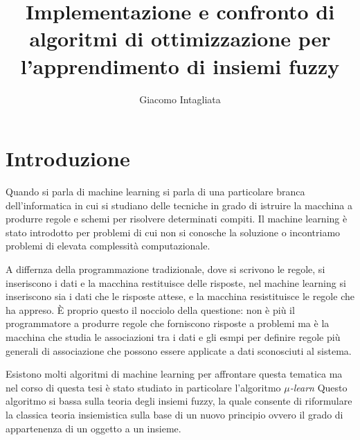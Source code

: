 \documentclass[a4paper,12pt]{report}
\begin{document}
\title{Implementazione e confronto di algoritmi di ottimizzazione per l'apprendimento di insiemi fuzzy}
\author{Giacomo Intagliata}
%
% 
%
\beforepreface

%
%
\afterpreface

%
\chapter*{Introduzione}
\label{Introduzione}

Quando si parla di machine learning si parla di una particolare branca dell'informatica in cui si studiano delle tecniche in grado di istruire la macchina a produrre regole e schemi per risolvere determinati compiti. Il machine learning è stato introdotto per problemi di cui non si conosche la soluzione o incontriamo problemi di elevata complessità computazionale.

A differnza della programmazione tradizionale, dove si scrivono le regole, si inseriscono i dati e la macchina restituisce delle risposte, nel machine learning si inseriscono sia i dati che le risposte attese, e la macchina resistituisce le regole che ha appreso. \`E proprio questo il nocciolo della questione: non è più il programmatore a produrre regole che forniscono risposte a problemi ma è la macchina che studia le associazioni tra i dati e gli esmpi per definire regole più generali di associazione che possono essere applicate a dati sconosciuti al sistema.

Esistono molti algoritmi di machine learning per affrontare questa tematica ma nel corso di questa tesi è stato studiato in particolare l'algoritmo \textit{$\mu$-learn} Questo algoritmo si bassa sulla teoria degli insiemi fuzzy, la quale consente di riformulare la classica teoria insiemistica sulla base di un nuovo principio ovvero il grado di appartenenza di un oggetto a un insieme. 
\end{document}

